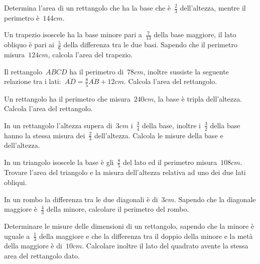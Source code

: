 \begin{multicols}{2}
\begin{esercizio}[\Ast]
\label{ese:16.90}
Determina l'area di un rettangolo che ha la base che è~$\frac{2}{3}$ dell'altezza, mentre il perimetro è~$144\unit{cm}$.
\end{esercizio}

\begin{esercizio}[\Ast]
\label{ese:16.91}
Un trapezio isoscele ha la base minore pari a~$\frac{7}{13}$ della base maggiore, il lato obliquo è pari ai~$\frac{5}{6}$ della differenza tra le due basi. Sapendo che il perimetro misura~$124\unit{cm}$, calcola l'area del trapezio.
\end{esercizio}

\begin{esercizio}[\Ast]
\label{ese:16.92}
Il rettangolo~$ABCD$ ha il perimetro di~$78\unit{cm}$, inoltre sussiste la seguente relazione tra i lati:~$\overline{AD}=\frac{8}{5}\overline{AB}+12\unit{cm}$. Calcola l'area del rettangolo.
\end{esercizio}

\begin{esercizio}[\Ast]
\label{ese:16.93}
Un rettangolo ha il perimetro che misura~$240\unit{cm}$, la base è tripla dell'altezza. Calcola l'area del rettangolo.
\end{esercizio}

\begin{esercizio}[\Ast]
\label{ese:16.94}
In un rettangolo l'altezza supera di~$3\unit{cm}$ i~$\frac{3}{4}$ della base, inoltre i~$\frac{3}{2}$ della base hanno la stessa misura dei~$\frac{2}{3}$ dell'altezza. Calcola le misure della base e dell'altezza.
\end{esercizio}

\begin{esercizio}[\Ast]
\label{ese:16.95}
In un triangolo isoscele la base è gli~$\frac{8}{5}$ del lato ed il perimetro misura~$108\unit{cm}$. Trovare l'area del triangolo e la misura dell'altezza relativa ad uno dei due lati obliqui.
\end{esercizio}

\begin{esercizio}[\Ast]
\label{ese:16.96}
In un rombo la differenza tra le due diagonali è di~$3\unit{cm}$. Sapendo che la diagonale maggiore è~$\frac{4}{3}$ della minore, calcolare il perimetro del rombo.
\end{esercizio}

\begin{esercizio}[\Ast]
\label{ese:16.97}
Determinare le misure delle dimensioni di un rettangolo, sapendo che la minore è uguale a~$\frac{1}{3}$ della maggiore e che la differenza tra il doppio della minore e la metà della maggiore è di~$10\unit{cm}$. Calcolare inoltre il lato del quadrato avente la stessa area del rettangolo dato.
\end{esercizio}


\end{multicols}
